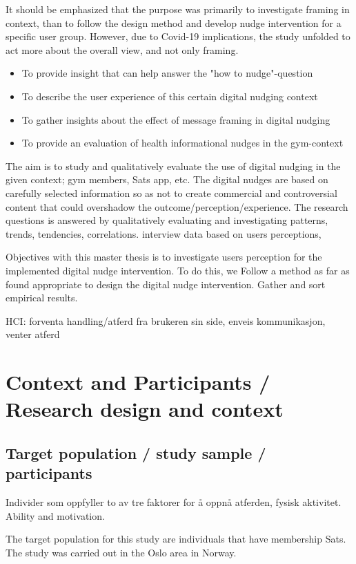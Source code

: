 It should be emphasized that the purpose was primarily to investigate framing in context, than to follow the design method and develop nudge intervention for a specific user group. However, due to Covid-19 implications, the study unfolded to act more about the overall view, and not only framing. 

\begin{itemize}
\item To provide insight that can help answer the "how to nudge"-question 
\item To describe the user experience of this certain digital nudging context 
\item To gather insights about the effect of message framing in digital nudging 
\item To provide an evaluation of health informational nudges in the gym-context
\end{itemize}

The aim is to study and qualitatively evaluate the use of digital nudging in the given context; gym members, Sats app, etc. 
The digital nudges are based on carefully selected information so as not to create commercial and controversial content that could overshadow the outcome/perception/experience. 
The research questions is answered by qualitatively evaluating and investigating patterns, trends, tendencies, correlations. interview data based on users perceptions,  

Objectives with this master thesis is to investigate users perception for the implemented digital nudge intervention. To do this, we Follow a method as far as found appropriate to design the digital nudge intervention. Gather and sort empirical results. 

HCI: forventa handling/atferd fra brukeren sin side, enveis kommunikasjon, venter atferd 

\section{Context and Participants / Research design and context}
\subsection{Target population / study sample / participants}
Individer som oppfyller to av tre faktorer for å oppnå atferden, fysisk aktivitet. Ability and motivation. 

The target population for this study are individuals that have membership Sats. The study was carried out in the Oslo area in Norway.  

